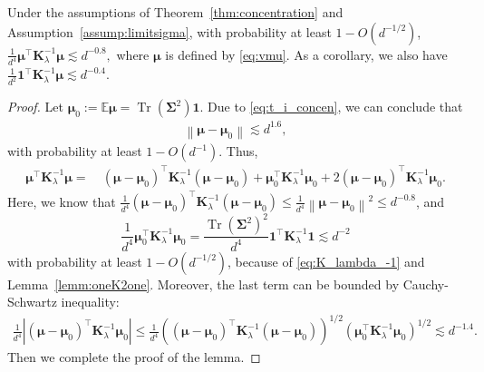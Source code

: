 \documentclass[twoside,11pt]{article}
\newcommand{\norm}[1]{\left\|#1\right\|}
\newcommand{\E}{\mathbb{E}}
\def\bK{{\boldsymbol K}}
\def\bSigma{{\boldsymbol \Sigma}}
\renewcommand{\bK}{\boldsymbol{K}}
\newcommand{\Tr}{\operatorname{Tr}}
\newcommand{\vmu}{\mbi{\mu}}
\newcommand{\1}{\mathbf{1}}
\def\mbi#1{\boldsymbol{#1}}
\def\mbi#1{\boldsymbol{#1}} %
\begin{document}
\begin{lemma}\label{lemm:uKu}
Under the assumptions of Theorem~\ref{thm:concentration} and Assumption~\ref{assump:limitsigma},  with probability at least $1-O(d^{-1/2})$,
$
    \frac{1}{d^4}  \vmu^\top\bK_{\lambda}^{-1}\vmu\lesssim d^{-0.8},
$
 where $\vmu$ is defined by \eqref{eq:vmu}. 
As a corollary, we also have
$
    \frac{1}{d^2}  \1^\top\bK_{\lambda}^{-1}\vmu\lesssim d^{-0.4}$.
\end{lemma}
\begin{proof}
Let $\vmu_0:=\E\vmu = \Tr(\bSigma^2)\1$. Due to \eqref{eq:t_i_concen}, we can conclude that
    \begin{align}\label{eq:vmu-concen_norm}
        \norm{\vmu-\vmu_0}\lesssim d^{1.6},
    \end{align}with probability at least $1-O(d^{-1})$. 
Thus,
\begin{align}
     \vmu^\top\bK_{\lambda}^{-1}\vmu= ~&  (\vmu-\vmu_0)^\top\bK_{\lambda}^{-1}(\vmu-\vmu_0)+ \vmu_0^\top\bK_{\lambda}^{-1}\vmu_0+2  (\vmu-\vmu_0)^\top\bK_{\lambda}^{-1}\vmu_0.
\end{align}
Here, we know that $\frac{1}{d^4}  (\vmu-\vmu_0)^\top\bK_{\lambda}^{-1}(\vmu-\vmu_0)\le \frac{1}{d^4}\norm{\vmu-\vmu_0}^2\le d^{-0.8}$,
and $$\frac{1}{d^4}  \vmu_0^\top\bK_{\lambda}^{-1}\vmu_0=\frac{\Tr(\bSigma^2)^2}{d^4}  \1^\top\bK_{\lambda}^{-1}\1\lesssim d^{-2}$$ 
with probability at least $1-O(d^{-1/2})$, because of \eqref{eq:K_lambda_-1} and Lemma~\ref{lemm:oneK2one}. Moreover, the last term can be bounded by Cauchy-Schwartz inequality:
\begin{align}
    \frac{1}{d^4}  |(\vmu-\vmu_0)^\top\bK_{\lambda}^{-1}\vmu_0|\le \frac{1}{d^4} \left((\vmu-\vmu_0)^\top\bK_{\lambda}^{-1}(\vmu-\vmu_0)\right)^{1/2}\left(\vmu_0^\top\bK_{\lambda}^{-1}\vmu_0\right)^{1/2}\lesssim d^{-1.4}.
\end{align}
Then we complete the proof of the lemma.
\end{proof}
\end{document}
